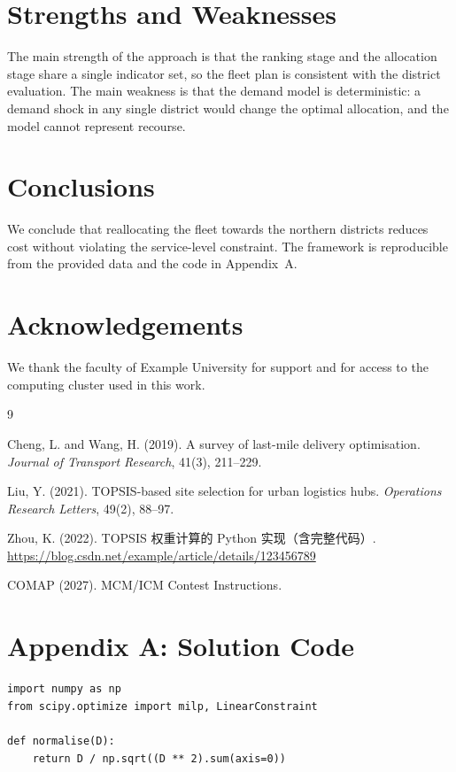 \documentclass[10pt]{article}
\begin{document}
\section{Strengths and Weaknesses}

The main strength of the approach is that the ranking stage and the allocation
stage share a single indicator set, so the fleet plan is consistent with the
district evaluation. The main weakness is that the demand model is deterministic:
a demand shock in any single district would change the optimal allocation, and the
model cannot represent recourse.

\section{Conclusions}

We conclude that reallocating the fleet towards the northern districts reduces
cost without violating the service-level constraint. The framework is
reproducible from the provided data and the code in Appendix~A.

\section{Acknowledgements}

We thank the faculty of Example University for support and for access to the
computing cluster used in this work.

\begin{thebibliography}{9}

Cheng, L. and Wang, H. (2019). A survey of last-mile delivery optimisation.
\emph{Journal of Transport Research}, 41(3), 211--229.

Liu, Y. (2021). TOPSIS-based site selection for urban logistics hubs.
\emph{Operations Research Letters}, 49(2), 88--97.

Zhou, K. (2022). TOPSIS 权重计算的 Python 实现（含完整代码）.
\url{https://blog.csdn.net/example/article/details/123456789}

COMAP (2027). MCM/ICM Contest Instructions.

\end{thebibliography}

\appendix
\section{Appendix A: Solution Code}

\begin{verbatim}
import numpy as np
from scipy.optimize import milp, LinearConstraint

def normalise(D):
    return D / np.sqrt((D ** 2).sum(axis=0))
\end{verbatim}

\end{document}
